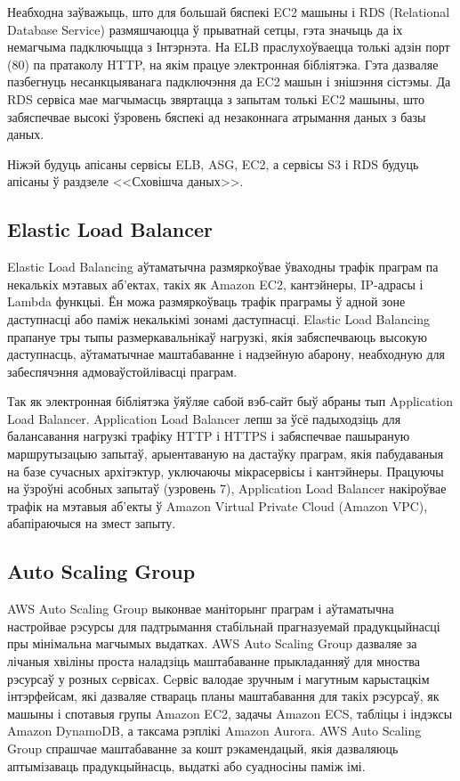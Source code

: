 Неабходна заўважыць, што для большай бяспекі EC2 машыны і RDS (Relational Database Service)
размяшчаюцца ў прыватнай сетцы, гэта значыць да іх немагчыма падключыцца з Інтэрнэта.
На ELB праслухоўваецца толькі адзін порт (80) па пратаколу HTTP, на якім працуе электронная бібліятэка.
Гэта дазваляе пазбегнуць несанкцыяванага падключэння да EC2 машын і знішэння сістэмы.
Да RDS сервіса мае магчымасць звяртацца з запытам толькі EC2 машыны, што забяспечвае высокі ўзровень
бяспекі ад незаконнага атрымання даных з базы даных.

Ніжэй будуць апісаны сервісы ELB, ASG, EC2, а сервісы S3 і RDS будуць апісаны ў раздзеле <<Сховішча даных>>.

\subsection{Elastic Load Balancer}

Elastic Load Balancing аўтаматычна размяркоўвае ўваходны трафік праграм па некалькіх мэтавых аб'ектах, такіх як Amazon EC2, кантэйнеры, IP-адрасы і Lambda функцыі. Ён можа размяркоўваць трафік праграмы ў адной зоне даступнасці або паміж некалькімі зонамі даступнасці. Elastic Load Balancing прапануе тры тыпы размеркавальнікаў нагрузкі, якія забяспечваюць высокую даступнасць, аўтаматычнае маштабаванне і надзейную абарону, неабходную для забеспячэння адмоваўстойлівасці праграм.

Так як электронная бібліятэка ўяўляе сабой вэб-сайт быў абраны тып Application Load Balancer.
Application Load Balancer лепш за ўсё падыходзіць для балансавання нагрузкі трафіку HTTP і HTTPS і забяспечвае пашыраную маршрутызацыю запытаў, арыентаваную на дастаўку праграм, якія пабудаваныя на базе сучасных архітэктур, уключаючы мікрасервісы і кантэйнеры. Працуючы на ўзроўні асобных запытаў (узровень 7), Application Load Balancer накіроўвае трафік на мэтавыя аб'екты ў Amazon Virtual Private Cloud (Amazon VPC), абапіраючыся на змест запыту.

\subsection{Auto Scaling Group}

AWS Auto Scaling Group выконвае маніторынг праграм і аўтаматычна настройвае рэсурсы для падтрымання стабільнай прагназуемай прадукцыйнасці пры мінімальна магчымых выдатках. AWS Auto Scaling Group дазваляе за лічаныя хвіліны проста наладзіць маштабаванне прыкладанняў для мноства рэсурсаў у розных сeрвісах. Сeрвіс валодае зручным і магутным карыстацкім інтэрфейсам, які дазваляе ствараць планы маштабавання для такіх рэсурсаў, як машыны і спотавыя групы Amazon EC2, задачы Amazon ECS, табліцы і індэксы Amazon DynamoDB, а таксама рэплікі Amazon Aurora. AWS Auto Scaling Group спрашчае маштабаванне за кошт рэкамендацый, якія дазваляюць аптымізаваць прадукцыйнасць, выдаткі або суадносіны паміж імі.

